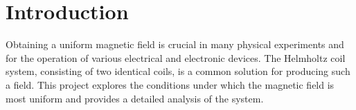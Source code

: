 \chapter{Introduction}

Obtaining a uniform magnetic field is crucial in many physical experiments and for the operation of various electrical and electronic devices. The Helmholtz coil system, consisting of two identical coils, is a common solution for producing such a field. This project explores the conditions under which the magnetic field is most uniform and provides a detailed analysis of the system.
